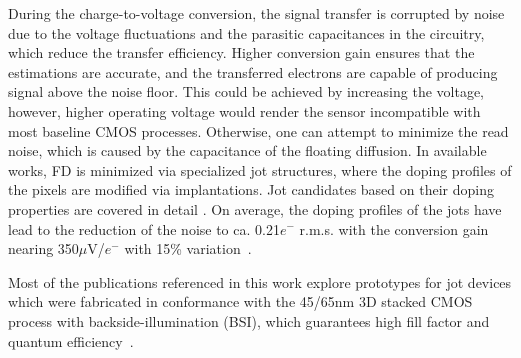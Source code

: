 
During the charge-to-voltage conversion, the signal transfer is corrupted by noise  due to the voltage fluctuations and the parasitic capacitances in the circuitry, which reduce the transfer efficiency. %
Higher conversion gain ensures that the estimations are accurate, and the transferred electrons are capable of producing signal above the noise floor. This could be achieved by increasing the voltage, however, higher operating voltage would render the sensor incompatible with most baseline CMOS processes.\cite{Ma:17} Otherwise, one can attempt to minimize the read noise, which is caused by the capacitance of the floating diffusion. In available works, FD is minimized via specialized jot structures, where the doping profiles of the pixels are modified via implantations.
Jot candidates based on their doping properties are covered in detail \cite{Masoodian16, Ma:17}. On average, the doping profiles of the jots have lead to the reduction of the noise to ca. 0.21$e^{-}$ r.m.s. with the conversion gain nearing 350$\mu$V/$e^{-}$ with 15\% variation~\cite{Ma:17}.

Most of the publications referenced in this work explore prototypes for jot devices which were fabricated in conformance with the 45/65nm 3D stacked CMOS process with backside-illumination (BSI), which guarantees high fill factor and quantum efficiency~\cite{Ma03rmsJot}.

